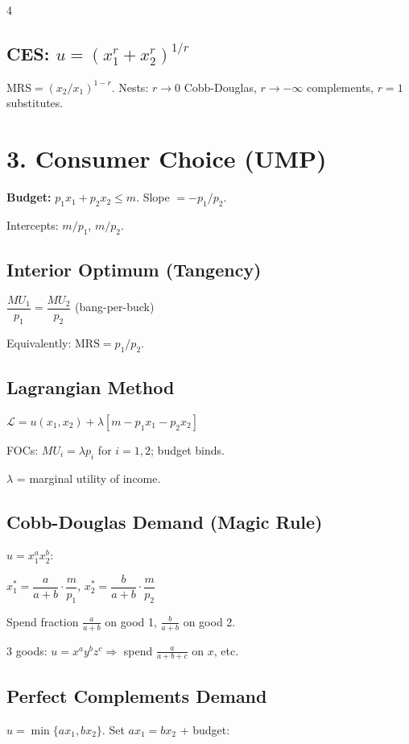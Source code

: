 \documentclass[8pt,landscape]{extarticle}
\newcommand{\HI}[1]{\colorbox{yellow!30}{#1}}
\begin{document}
\begin{multicols}{4}
\subsection{CES: $u=(x_1^r + x_2^r)^{1/r}$}
$\text{MRS} = (x_2/x_1)^{1-r}$. Nests: $r\to 0$ Cobb-Douglas, $r\to -\infty$ complements, $r=1$ substitutes.

\section{3. Consumer Choice (UMP)}

\textbf{Budget:} $p_1 x_1 + p_2 x_2 \leq m$. Slope $= -p_1/p_2$.

Intercepts: $m/p_1$, $m/p_2$.

\subsection{Interior Optimum (Tangency)}
\HI{$\dfrac{MU_1}{p_1} = \dfrac{MU_2}{p_2}$} \quad (bang-per-buck)

Equivalently: $\text{MRS} = p_1/p_2$.

\subsection{Lagrangian Method}
$\mathcal{L} = u(x_1,x_2) + \lambda[m - p_1 x_1 - p_2 x_2]$

FOCs: $MU_i = \lambda p_i$ for $i=1,2$; budget binds.

$\lambda$ = marginal utility of income.

\subsection{\HI{Cobb-Douglas Demand (Magic Rule)}}
$u = x_1^a x_2^b$:

\HI{$x_1^* = \dfrac{a}{a+b}\cdot\dfrac{m}{p_1}$}, \quad \HI{$x_2^* = \dfrac{b}{a+b}\cdot\dfrac{m}{p_2}$}

Spend fraction $\frac{a}{a+b}$ on good 1, $\frac{b}{a+b}$ on good 2.

3 goods: $u=x^a y^b z^c \Rightarrow$ spend $\frac{a}{a+b+c}$ on $x$, etc.

\subsection{\HI{Perfect Complements Demand}}
$u = \min\{ax_1, bx_2\}$. Set $ax_1 = bx_2$ + budget:


\end{multicols}
\end{document}
